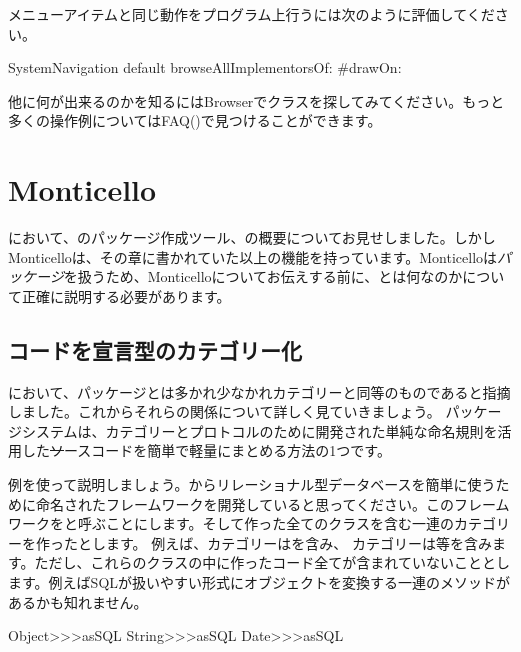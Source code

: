 \documentclass[a4paper,10pt,twoside]{book}
\begin{document}
メニューアイテムと同じ動作をプログラム上行うには次のように評価してください。
\begin{code}{}
SystemNavigation default browseAllImplementorsOf: #drawOn:
\end{code}

他に何が出来るのかを知るにはBrowserでクラスを探してみてください。もっと多くの操作例についてはFAQ()で見つけることができます。

\section{Monticello}

において、\pharo のパッケージ作成ツール、の概要についてお見せしました。しかしMonticelloは、その章に書かれていた以上の機能を持っています。Monticelloは\emph{パッケージ}を扱うため、Monticelloについてお伝えする前に、とは何なのかについて正確に説明する必要があります。

\subsection{\pharo コードを宣言型のカテゴリー化}

において、パッケージとは多かれ少なかれカテゴリーと同等のものであると指摘しました。これからそれらの関係について詳しく見ていきましょう。
パッケージシステムは、カテゴリーとプロトコルのために開発された単純な命名規則を活用した\st ソースコードを簡単で軽量にまとめる方法の1つです。

例を使って説明しましょう。\pharo からリレーショナル型データベースを簡単に使うために命名されたフレームワークを開発していると思ってください。このフレームワークをと呼ぶことにします。そして作った全てのクラスを含む一連のカテゴリーを作ったとします。
例えば、カテゴリーはを含み、 カテゴリーは等を含みます。ただし、これらのクラスの中に作ったコード全てが含まれていないこととします。例えばSQLが扱いやすい形式にオブジェクトを変換する一連のメソッドがあるかも知れません。

\begin{code}{}
Object>>>asSQL
String>>>asSQL
Date>>>asSQL
\end{code}
\end{document}
